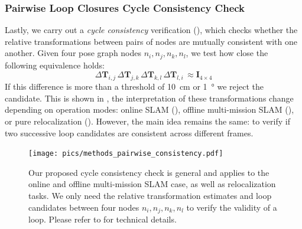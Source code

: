 \subsubsection*{\textbf{Pairwise Loop Closures Cycle Consistency Check}}
Lastly, we carry out a \emph{cycle consistency} verification (), which checks whether the relative transformations between pairs of nodes are mutually consistent with one another. Given four pose graph nodes $n_i, n_j, n_k, n_l$, we test how close the following equivalence holds:
\begin{equation}
\Delta\mathbf{T}_{i,j}\, \Delta\mathbf{T}_{j,k}\, \Delta\mathbf{T}_{k,l}\, \Delta\mathbf{T}_{l,i}\, \approx \mathbf{I}_{4\times4} 
\end{equation}
If this difference is more than a threshold of \SI{10}{\centi\meter} or \SI{1}{\degree} we reject the candidate. This is shown in , the interpretation of these transformations change depending on operation modes: online SLAM (), offline multi-mission SLAM (), or pure relocalization (). However, the main idea remains the same: to verify if two successive loop candidates are consistent across different frames.
\begin{figure}[t]
  \centering
  \texttt{[image: pics/methods\_pairwise\_consistency.pdf]}
  \caption{Our proposed cycle consistency check is general and applies to the online and offline multi-mission SLAM case, as well as relocalization tasks. We only need the relative transformation estimates and loop candidates between four nodes $n_i, n_j, n_k, n_l$ to verify the validity of a loop. Please refer to  for technical details.}
  \label{fig:cycle-consistency}
\end{figure}

